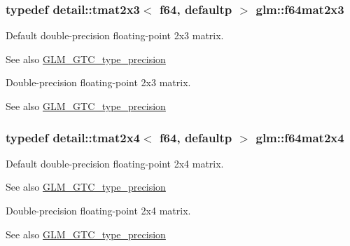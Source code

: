 \subsubsection[{\texorpdfstring{f64mat2x3}{f64mat2x3}}]{\setlength{\rightskip}{0pt plus 5cm}typedef detail\+::tmat2x3$<$ f64, defaultp $>$ {\bf glm\+::f64mat2x3}}\hypertarget{group__gtc__type__precision_ga5b665390818b04bdd95bb6b2a25e5c2c}{}\label{group__gtc__type__precision_ga5b665390818b04bdd95bb6b2a25e5c2c}
Default double-\/precision floating-\/point 2x3 matrix. \begin{DoxySeeAlso}{See also}
\hyperlink{group__gtc__type__precision}{G\+L\+M\+\_\+\+G\+T\+C\+\_\+type\+\_\+precision}
\end{DoxySeeAlso}
Double-\/precision floating-\/point 2x3 matrix. \begin{DoxySeeAlso}{See also}
\hyperlink{group__gtc__type__precision}{G\+L\+M\+\_\+\+G\+T\+C\+\_\+type\+\_\+precision} 
\end{DoxySeeAlso}
\subsubsection[{\texorpdfstring{f64mat2x4}{f64mat2x4}}]{\setlength{\rightskip}{0pt plus 5cm}typedef detail\+::tmat2x4$<$ f64, defaultp $>$ {\bf glm\+::f64mat2x4}}\hypertarget{group__gtc__type__precision_ga7f84d2c51081d56599a45c01d67ac155}{}\label{group__gtc__type__precision_ga7f84d2c51081d56599a45c01d67ac155}
Default double-\/precision floating-\/point 2x4 matrix. \begin{DoxySeeAlso}{See also}
\hyperlink{group__gtc__type__precision}{G\+L\+M\+\_\+\+G\+T\+C\+\_\+type\+\_\+precision}
\end{DoxySeeAlso}
Double-\/precision floating-\/point 2x4 matrix. \begin{DoxySeeAlso}{See also}
\hyperlink{group__gtc__type__precision}{G\+L\+M\+\_\+\+G\+T\+C\+\_\+type\+\_\+precision} 
\end{DoxySeeAlso}
